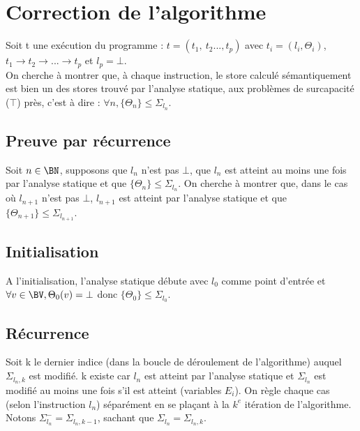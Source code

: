 
\section{Correction de l'algorithme}
Soit t une exécution du programme : $t=(t_1,\ t_2..., t_p)$ avec $t_i=(l_i, \Theta_i)$, $t_1\longrightarrow t_2\longrightarrow ...\longrightarrow t_p$ et $l_p = \bot$.\\
On cherche à montrer que, à chaque instruction, le store calculé sémantiquement est bien un des stores trouvé par l'analyse statique, aux problèmes de surcapacité ($\top$) près, c'est à dire : $\forall n, \{\Theta_n\}\leq\Sigma_{l_n}$.


\subsection{Preuve par récurrence}
Soit $n\in \BN$, supposons que $l_n$ n'est pas $\bot$, que $l_n$ est atteint au moins une fois par l'analyse statique et que $\{\Theta_n\}\leq\Sigma_{l_n}$. On cherche à montrer que, dans le cas où $l_{n+1}$ n'est pas $\bot$, $l_{n+1}$ est atteint par l'analyse statique et que $\{\Theta_{n+1}\}\leq\Sigma_{l_{n+1}}$.
\subsection{Initialisation}
A l'initialisation, l'analyse statique débute avec $l_0$ comme point d'entrée et $\forall v\in\BV, \Theta_0(v)=\bot$ donc $\{\Theta_0\}\leq\Sigma_{l_0}$.
\subsection{Récurrence}
Soit k le dernier indice (dans la boucle de déroulement de l'algorithme) auquel $\Sigma_{{l_n},k}$ est modifié. k existe car $l_n$ est atteint par l'analyse statique et $\Sigma_{l_n}$ est modifié au moins une fois s'il est atteint (variables $E_i$). On règle chaque cas (selon l'instruction $l_n$) séparément en se plaçant à la $k^e$ itération de l'algorithme.\\
Notons $\Sigma^{-}_{l_n}=\Sigma_{{l_n},k-1}$, sachant que $\Sigma_{l_n}=\Sigma_{{l_n},k}$.


